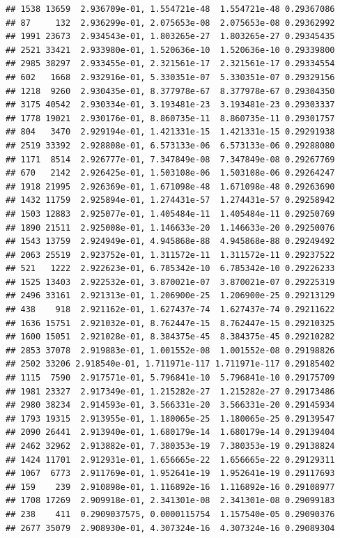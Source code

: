 \documentclass[
]{article}
\begin{document}
\begin{verbatim}
## 1538 13659  2.936709e-01, 1.554721e-48  1.554721e-48 0.29367086
## 87     132  2.936299e-01, 2.075653e-08  2.075653e-08 0.29362992
## 1991 23673  2.934543e-01, 1.803265e-27  1.803265e-27 0.29345435
## 2521 33421  2.933980e-01, 1.520636e-10  1.520636e-10 0.29339800
## 2985 38297  2.933455e-01, 2.321561e-17  2.321561e-17 0.29334554
## 602   1668  2.932916e-01, 5.330351e-07  5.330351e-07 0.29329156
## 1218  9260  2.930435e-01, 8.377978e-67  8.377978e-67 0.29304350
## 3175 40542  2.930334e-01, 3.193481e-23  3.193481e-23 0.29303337
## 1778 19021  2.930176e-01, 8.860735e-11  8.860735e-11 0.29301757
## 804   3470  2.929194e-01, 1.421331e-15  1.421331e-15 0.29291938
## 2519 33392  2.928808e-01, 6.573133e-06  6.573133e-06 0.29288080
## 1171  8514  2.926777e-01, 7.347849e-08  7.347849e-08 0.29267769
## 670   2142  2.926425e-01, 1.503108e-06  1.503108e-06 0.29264247
## 1918 21995  2.926369e-01, 1.671098e-48  1.671098e-48 0.29263690
## 1432 11759  2.925894e-01, 1.274431e-57  1.274431e-57 0.29258942
## 1503 12883  2.925077e-01, 1.405484e-11  1.405484e-11 0.29250769
## 1890 21511  2.925008e-01, 1.146633e-20  1.146633e-20 0.29250076
## 1543 13759  2.924949e-01, 4.945868e-88  4.945868e-88 0.29249492
## 2063 25519  2.923752e-01, 1.311572e-11  1.311572e-11 0.29237522
## 521   1222  2.922623e-01, 6.785342e-10  6.785342e-10 0.29226233
## 1525 13403  2.922532e-01, 3.870021e-07  3.870021e-07 0.29225319
## 2496 33161  2.921313e-01, 1.206900e-25  1.206900e-25 0.29213129
## 438    918  2.921162e-01, 1.627437e-74  1.627437e-74 0.29211622
## 1636 15751  2.921032e-01, 8.762447e-15  8.762447e-15 0.29210325
## 1600 15051  2.921028e-01, 8.384375e-45  8.384375e-45 0.29210282
## 2853 37078  2.919883e-01, 1.001552e-08  1.001552e-08 0.29198826
## 2502 33206 2.918540e-01, 1.711971e-117 1.711971e-117 0.29185402
## 1115  7590  2.917571e-01, 5.796841e-10  5.796841e-10 0.29175709
## 1981 23327  2.917349e-01, 1.215282e-27  1.215282e-27 0.29173486
## 2980 38234  2.914593e-01, 3.566331e-20  3.566331e-20 0.29145934
## 1793 19315  2.913955e-01, 1.180065e-25  1.180065e-25 0.29139547
## 2090 26441  2.913940e-01, 1.680179e-14  1.680179e-14 0.29139404
## 2462 32962  2.913882e-01, 7.380353e-19  7.380353e-19 0.29138824
## 1424 11701  2.912931e-01, 1.656665e-22  1.656665e-22 0.29129311
## 1067  6773  2.911769e-01, 1.952641e-19  1.952641e-19 0.29117693
## 159    239  2.910898e-01, 1.116892e-16  1.116892e-16 0.29108977
## 1708 17269  2.909918e-01, 2.341301e-08  2.341301e-08 0.29099183
## 238    411  0.2909037575, 0.0000115754  1.157540e-05 0.29090376
## 2677 35079  2.908930e-01, 4.307324e-16  4.307324e-16 0.29089304

\end{verbatim}
\end{document}
